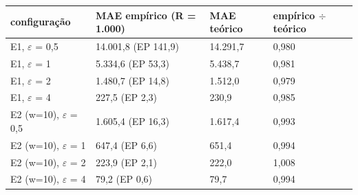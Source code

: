 \begin{tabular}{llll}
\toprule
configuração & MAE empírico (R = 1.000) & MAE teórico & empírico $\div$ teórico \\
\midrule
E1, $\varepsilon$ = 0,5 & 14.001,8 (EP 141,9) & 14.291,7 & 0,980 \\
E1, $\varepsilon$ = 1 & 5.334,6 (EP 53,3) & 5.438,7 & 0,981 \\
E1, $\varepsilon$ = 2 & 1.480,7 (EP 14,8) & 1.512,0 & 0,979 \\
E1, $\varepsilon$ = 4 & 227,5 (EP 2,3) & 230,9 & 0,985 \\
E2 (w=10), $\varepsilon$ = 0,5 & 1.605,4 (EP 16,3) & 1.617,4 & 0,993 \\
E2 (w=10), $\varepsilon$ = 1 & 647,4 (EP 6,6) & 651,4 & 0,994 \\
E2 (w=10), $\varepsilon$ = 2 & 223,9 (EP 2,1) & 222,0 & 1,008 \\
E2 (w=10), $\varepsilon$ = 4 & 79,2 (EP 0,6) & 79,7 & 0,994 \\
\bottomrule
\end{tabular}
